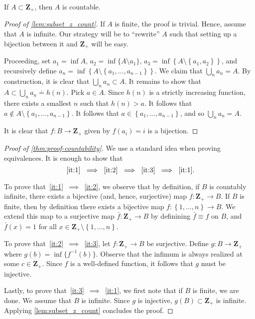 \begin{lemma}\label{lem:subset_z_count}
	If $A \subset \mathbf{Z}_{+}$, then $A$ is countable.
\end{lemma}
\begin{proof}[Proof of \cref{lem:subset_z_count}]
	If $A$ is finite, the proof is trivial. Hence, assume that $A$ is infinite.
	Our strategy will be to ``rewrite'' $A$ such that setting up a bijection
	between it and $\mathbf{Z}_{+}$ will be easy.

	Proceeding, set $a_1 = \inf A$, $a_{2} = \inf \{A \setminus {a_{1}}\}$,
	$a_{3} = \inf \left\{ A \setminus \left\{ a_{1}, a_{2} \right\} \right\}$,
	and recursively define $a_{n} = \inf \left\{ A \setminus \left\{
			a_{1}, \dots,
	a_{n-1} \right\}\right\}$. We claim that $\bigcup_{n} a_{n} = A$. By
	construction, it is clear that $\bigcup_{n} a_{n} \subset A$. It remains to show
	that $A \subset \bigcup_{n} a_{n} \doteq h(n)$. Pick $a \in A$. Since
	$h(n)$ is a strictly increasing function, there exists a smallest $n$ such that
	$h(n) > a$. It follows that
	$a \not \in A \setminus\left\{ a_{1}, \dots, a_{n-1} \right\}$. It follows that
	$a \in \left\{ a_{1}, \dots, a_{n-1} \right\}$, and so
	$\bigcup_{n} a_{n} = A$.

	It is clear that $f: B \to
	\mathbf{Z}_{+}$ given by $f(a_{i}) = i$ is a bijection.

\end{proof}

\begin{proof}[Proof of \cref{thm:proof-countability}]
	We use a standard idea when proving equivalences. It is enough to show that
	\[~\eqref{it:1}~\implies~\eqref{it:2}~\implies~\eqref{it:3}~\implies~\eqref{it:1}.\]

	To prove that~\eqref{it:1}~$\implies$~\eqref{it:2}, we observe that by
	definition, if $B$ is countably infinite, there exists a bijective
	(and, hence, surjective) map  $f: \mathbf{Z}_{+} \to B$.
	If $B$ is finite, then by definition there exists a bijective map
	$f: \left\{ 1, \dots, n \right\} \to B$. We extend this map to a surjective
	map $\bar{f}: \mathbf{Z}_{+} \to B$ by definining $\bar{f} \equiv f$ on $B$,
	and $\bar{f}(x) = 1$ for all $x \in \mathbf{Z}_{+} \setminus \left\{ 1, \dots, n
	\right\}$.

	To prove that~\eqref{it:2}~$\implies$~\eqref{it:3}, let
	$f:\mathbf{Z}_{+} \to B$ be surjective. Define $g: B \to \mathbf{Z}_{+}$
	where $g(b) = \inf \{f^{-1}(b) \}$. Observe that the infimum is always
	realized at some $c \in \mathbf{Z}_{+}$. Since $f$ is a well-defined
	function, it follows that $g$ must be injective.

	Lastly, to prove that~\eqref{it:3}~$\implies$~\eqref{it:1}, we first note that
	if $B$ is finite, we are done. We assume that $B$ is infinite. Since $g$ is
	injective, $g(B) \subset \mathbf{Z}_{+}$ is infinite. Applying
	\cref{lem:subset_z_count} concludes the proof.

\end{proof}

